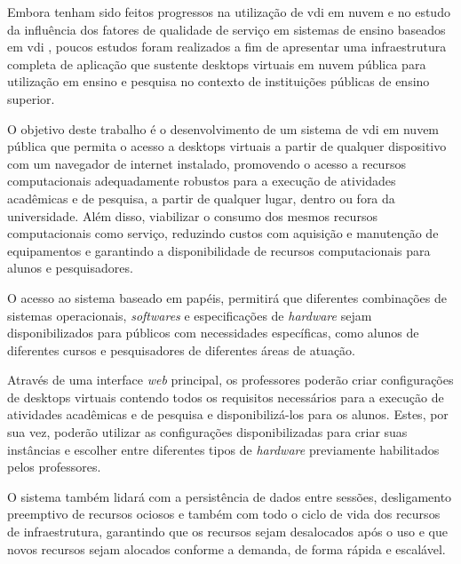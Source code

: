 Embora tenham sido feitos progressos na utilização de \gls{vdi} em nuvem e no estudo da influência dos fatores de qualidade de serviço em sistemas de ensino baseados em \gls{vdi} \citep{qoselearning}, poucos estudos foram realizados a fim de apresentar uma infraestrutura completa de aplicação que sustente \glspl{desktop} virtuais em nuvem pública para utilização em ensino e pesquisa no contexto de instituições públicas de ensino superior.

O objetivo deste trabalho é o desenvolvimento de um sistema de \gls{vdi} em nuvem pública que permita o acesso a \glspl{desktop} virtuais a partir de qualquer dispositivo com um navegador de internet instalado, promovendo o acesso a recursos computacionais adequadamente robustos para a execução de atividades acadêmicas e de pesquisa, a partir de qualquer lugar, dentro ou fora da universidade. Além disso, viabilizar o consumo dos mesmos recursos computacionais como serviço, reduzindo custos com aquisição e manutenção de equipamentos e garantindo a disponibilidade de recursos computacionais para alunos e pesquisadores.

O acesso ao sistema baseado em papéis, permitirá que diferentes combinações de sistemas operacionais, \textit{softwares} e especificações de \textit{hardware} sejam disponibilizados para públicos com necessidades específicas, como alunos de diferentes cursos e pesquisadores de diferentes áreas de atuação.

Através de uma interface \textit{web} principal, os professores poderão criar configurações de \glspl{desktop} virtuais contendo todos os requisitos necessários para a execução de atividades acadêmicas e de pesquisa e disponibilizá-los para os alunos. Estes, por sua vez, poderão utilizar as configurações disponibilizadas para criar suas instâncias e escolher entre diferentes tipos de \textit{hardware} previamente habilitados pelos professores.

O sistema também lidará com a persistência de dados entre sessões, desligamento preemptivo de recursos ociosos e também com todo o ciclo de vida dos recursos de infraestrutura, garantindo que os recursos sejam desalocados após o uso e que novos recursos sejam alocados conforme a demanda, de forma rápida e escalável.



